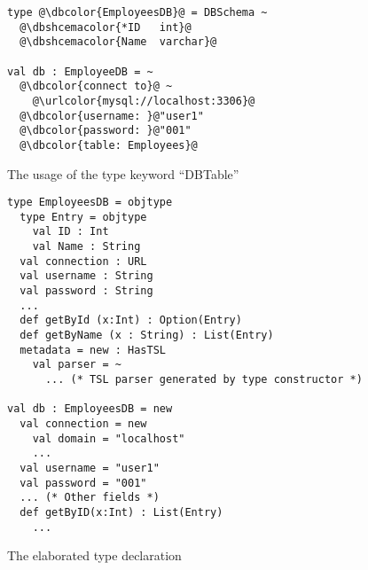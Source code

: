 \documentclass{sig-alternate}
\newcommand{\urlcolor}[1]{\textcolor[HTML]{FFCC33}{#1}}
\newcommand{\dbcolor}[1]{\textcolor[HTML]{FF47FF}{#1}}
\newcommand{\dbshcemacolor}[1]{\textcolor[HTML]{5AC3D1}{#1}}
\newcommand{\mycaption}[1]{\vspace{-4px}\caption{#1}\vspace{-2px}}
\begin{document}
\begin{figure}
\begin{lstlisting}[style=wyvern]
type @\dbcolor{EmployeesDB}@ = DBSchema ~
  @\dbshcemacolor{*ID   int}@
  @\dbshcemacolor{Name  varchar}@

val db : EmployeeDB = ~
  @\dbcolor{connect to}@ ~
    @\urlcolor{mysql://localhost:3306}@
  @\dbcolor{username: }@"user1"
  @\dbcolor{password: }@"001"
  @\dbcolor{table: Employees}@
\end{lstlisting}
\mycaption{The usage of the type keyword ``DBTable''}
\label{f-tykwexample}
\end{figure}

\begin{figure}[ht]
\begin{lstlisting}[style=wyvern]
type EmployeesDB = objtype
  type Entry = objtype
    val ID : Int
    val Name : String 
  val connection : URL
  val username : String
  val password : String
  ...
  def getById (x:Int) : Option(Entry)
  def getByName (x : String) : List(Entry)
  metadata = new : HasTSL
    val parser = ~
      ... (* TSL parser generated by type constructor *)

val db : EmployeesDB = new
  val connection = new
    val domain = "localhost"
    ...
  val username = "user1"
  val password = "001"
  ... (* Other fields *)
  def getByID(x:Int) : List(Entry)
    ...
\end{lstlisting}
\mycaption{The elaborated type declaration}
\label{typekw-example-2}
\end{figure}
\end{document}
